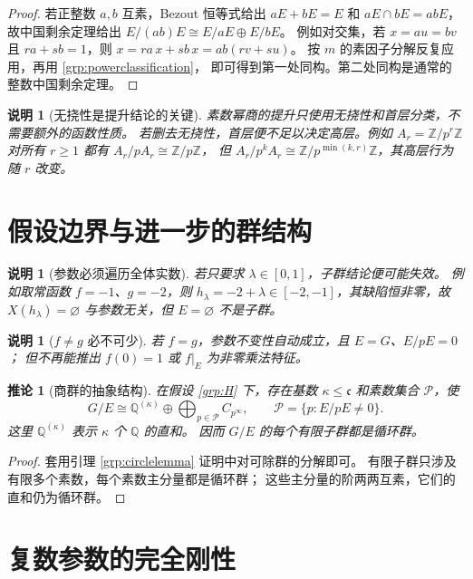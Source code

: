 \documentclass[11pt,a4paper,oneside,openany]{book}
\theoremstyle{lecture}
\newtheorem{corollary}[theorem]{推论}
\newtheorem{remark}[theorem]{说明}
\newcommand{\Q}{\mathbb Q}
\newcommand{\Z}{\mathbb Z}
\newcommand{\cfrak}{\mathfrak c}
\numberwithin{equation}{section}
\begin{document}
\begin{proof}
若正整数 $a,b$ 互素，Bezout 恒等式给出
$aE+bE=E$ 和 $aE\cap bE=abE$，故中国剩余定理给出
$E/(ab)E\cong E/aE\oplus E/bE$。
例如对交集，若 $x=au=bv$ 且 $ra+sb=1$，则
$x=ra\,x+sb\,x=ab(rv+su)$。
按 $m$ 的素因子分解反复应用，再用 \eqref{grp:powerclassification}，
即可得到第一处同构。第二处同构是通常的整数中国剩余定理。
\end{proof}

\begin{remark}[无挠性是提升结论的关键]
素数幂商的提升只使用无挠性和首层分类，不需要额外的函数性质。
若删去无挠性，首层便不足以决定高层。例如
$A_r=\Z/p^r\Z$ 对所有 $r\ge1$ 都有 $A_r/pA_r\cong\Z/p\Z$，
但 $A_r/p^kA_r\cong\Z/p^{\min(k,r)}\Z$，其高层行为随 $r$ 改变。
\end{remark}

\section{假设边界与进一步的群结构}

\begin{remark}[参数必须遍历全体实数]
若只要求 $\lambda\in[0,1]$，子群结论便可能失效。
例如取常函数 $f=-1$、$g=-2$，则
$h_\lambda=-2+\lambda\in[-2,-1]$，其缺陷恒非零，故
$X(h_\lambda)=\varnothing$ 与参数无关，但 $E=\varnothing$ 不是子群。
\end{remark}

\begin{remark}[$f\ne g$ 必不可少]
若 $f=g$，参数不变性自动成立，且 $E=G$、$E/pE=0$；
但不再能推出 $f(0)=1$ 或 $f|_E$ 为非零乘法特征。
\end{remark}

\begin{corollary}[商群的抽象结构]
在假设 \eqref{grp:H} 下，存在基数 $\kappa\le\cfrak$ 和素数集合 $\mathcal P$，使
\[
 G/E\cong
 \Q^{(\kappa)}
 \oplus\bigoplus_{p\in\mathcal P}C_{p^\infty},
 \qquad
 \mathcal P=\{p:E/pE\ne0\}.
\]
这里 $\Q^{(\kappa)}$ 表示 $\kappa$ 个 $\Q$ 的直和。
因而 $G/E$ 的每个有限子群都是循环群。
\end{corollary}

\begin{proof}
套用引理 \ref{grp:circlelemma} 证明中对可除群的分解即可。
有限子群只涉及有限多个素数，每个素数主分量都是循环群；
这些主分量的阶两两互素，它们的直和仍为循环群。
\end{proof}


\section{复数参数的完全刚性}\label{grp:complexsection}
\end{document}
